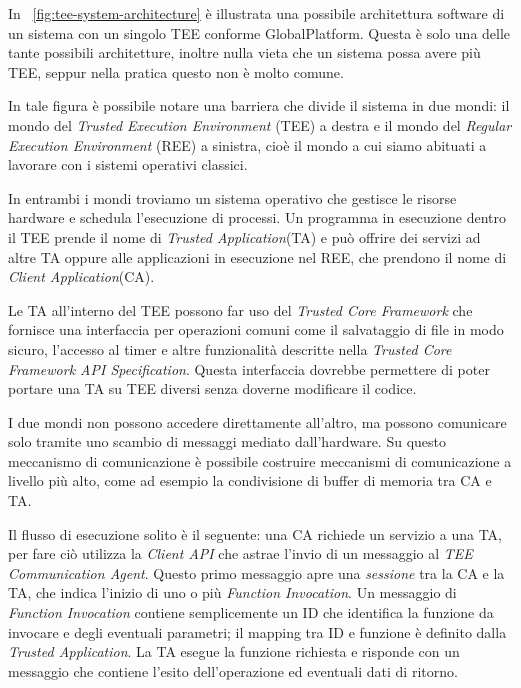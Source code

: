 \documentclass[12pt,italian]{report}
\begin{document}
In \figurename~\ref{fig:tee-system-architecture} è illustrata una possibile
architettura software di un sistema con un singolo TEE conforme
GlobalPlatform. Questa è solo una delle tante possibili architetture, inoltre
nulla vieta che un sistema possa avere più TEE, seppur nella pratica
questo non è molto comune.

In tale figura è possibile notare una barriera che divide il sistema in due
mondi: il mondo del \textit{Trusted Execution Environment} (TEE) a destra
e il mondo del \textit{Regular Execution Environment} (REE) a sinistra, cioè
il mondo a cui siamo abituati a lavorare con i sistemi operativi classici.

In entrambi i mondi troviamo un sistema operativo che gestisce le risorse
hardware e schedula l'esecuzione di processi. Un programma in esecuzione
dentro il TEE prende il nome di \textit{Trusted Application}(TA) e può
offrire dei servizi ad altre TA oppure alle applicazioni in esecuzione nel REE,
che prendono il nome di \textit{Client Application}(CA).

Le TA all'interno del TEE possono far uso del \textit{Trusted Core Framework}
che fornisce una interfaccia per operazioni comuni come il salvataggio
di file in modo sicuro, l'accesso al timer e altre funzionalità descritte
nella
\textit{Trusted Core Framework API Specification}\cite{gp2020internalapi}.
Questa interfaccia dovrebbe permettere di poter portare una TA su TEE diversi
senza doverne modificare il codice.

I due mondi non possono accedere direttamente all'altro, ma possono
comunicare solo tramite uno scambio di messaggi mediato dall'hardware.
Su questo meccanismo di comunicazione è possibile costruire meccanismi di
comunicazione a livello più alto, come ad esempio la condivisione di buffer
di memoria tra CA e TA.

\bigbreak \noindent

Il flusso di esecuzione solito è il seguente: una CA richiede un servizio a
una TA, per fare ciò utilizza la \textit{Client API} che astrae l'invio di un
messaggio al \textit{TEE Communication Agent}.
Questo primo messaggio apre una \textit{sessione} tra la CA e la TA, che
indica l'inizio di uno o più \textit{Function Invocation}.
Un messaggio di \textit{Function Invocation} contiene semplicemente un ID
che identifica la funzione da invocare e degli eventuali parametri;
il mapping tra ID e funzione è definito dalla \textit{Trusted Application}.
La TA esegue la funzione richiesta e risponde con un messaggio che contiene
l'esito dell'operazione ed eventuali dati di ritorno.
\end{document}
